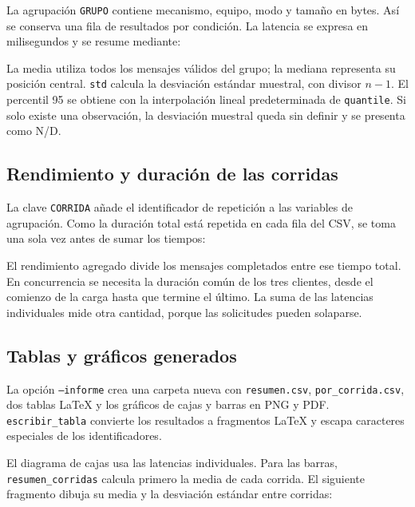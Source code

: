 

La agrupación \texttt{GRUPO} contiene mecanismo, equipo, modo y tamaño
en bytes. Así se conserva una fila de resultados por condición.
La latencia se expresa en milisegundos y se resume mediante:



La media utiliza todos los mensajes válidos del grupo; la mediana
representa su posición central. \texttt{std} calcula la desviación
estándar muestral, con divisor $n-1$. El percentil 95 se obtiene con
la interpolación lineal predeterminada de \texttt{quantile}.
Si solo existe una observación, la desviación muestral queda sin definir
y se presenta como N/D.

\subsection{Rendimiento y duración de las corridas}
La clave \texttt{CORRIDA} añade el identificador de repetición a las
variables de agrupación. Como la duración total está repetida en cada
fila del CSV, se toma una sola vez antes de sumar los tiempos:



El rendimiento agregado divide los mensajes completados entre ese
tiempo total. En concurrencia se necesita la duración común de los tres
clientes, desde el comienzo de la carga hasta que termine el último.
La suma de las latencias individuales mide otra cantidad, porque
las solicitudes pueden solaparse.

\subsection{Tablas y gráficos generados}
La opción \texttt{--informe} crea una carpeta nueva con
\texttt{resumen.csv}, \texttt{por\_corrida.csv}, dos tablas LaTeX y
los gráficos de cajas y barras en PNG y PDF.
\texttt{escribir\_tabla} convierte los resultados a fragmentos LaTeX
y escapa caracteres especiales de los identificadores.

El diagrama de cajas usa las latencias individuales. Para las barras,
\texttt{resumen\_corridas} calcula primero la media de cada corrida.
El siguiente fragmento dibuja su media y la desviación estándar entre
corridas:



